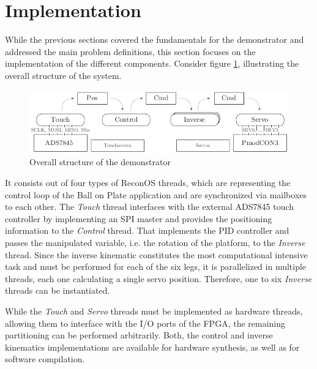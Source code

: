 \section{Implementation}
While the previous sections covered the fundamentals for the demonstrator and
addressed the main problem definitions, this section focuses on the
implementation of the different components. Consider figure
\ref{fig:demo_structure}, illustrating the overall structure of the system.
\begin{figure}
	\centering
	\includegraphics{../figures/demo_structure}
	\caption{Overall structure of the demonstrator}
	\label{fig:demo_structure}
\end{figure}
It consists out of four types of ReconOS threads, which are representing the
control loop of the Ball on Plate application and are synchronized via
mailboxes to each other. The \emph{Touch} thread interfaces with the external
ADS7845 touch controller by implementing an \ac{SPI} master and provides the
positioning information to the \emph{Control} thread. That implements the
\ac{PID} controller and passes the manipulated variable, i.e. the rotation of
the platform, to the \emph{Inverse} thread. Since the inverse kinematic
constitutes the most computational intensive task and must be performed for
each of the six legs, it is parallelized in multiple threads, each one
calculating a single servo position. Therefore, one to six \emph{Inverse}
threads can be instantiated.

While the \emph{Touch} and \emph{Servo} threads must be implemented as
hardware threads, allowing them to interface with the I/O ports of the FPGA,
the remaining partitioning can be performed arbitrarily. Both, the control and
inverse kinematics implementations are available for hardware synthesis, as
well as for software compilation.

